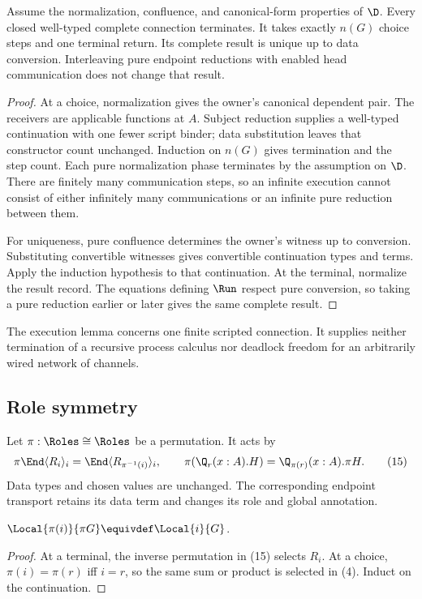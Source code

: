 \begin{lemma}
\label{thm:termination}
Assume the normalization, confluence, and canonical-form properties of $\D$.
Every closed well-typed complete connection terminates. It takes exactly
$n(G)$ choice steps and one terminal return. Its complete result is unique up
to data conversion. Interleaving pure endpoint reductions with enabled head
communication does not change that result.
\end{lemma}
\begin{proof}
At a choice, normalization gives the owner's canonical dependent pair. The
receivers are applicable functions at $A$. Subject reduction supplies a
well-typed continuation with one fewer script binder; data substitution leaves
that constructor count unchanged. Induction on $n(G)$ gives termination and
the step count. Each pure normalization phase terminates by the assumption on
$\D$. There are finitely many communication steps, so an infinite execution
cannot consist of either infinitely many communications or an infinite pure
reduction between them.

For uniqueness, pure confluence determines the owner's witness up to
conversion. Substituting convertible witnesses gives convertible continuation
types and terms. Apply the induction hypothesis to that continuation. At the
terminal, normalize the result record. The equations defining $\Run$ respect
pure conversion, so taking a pure reduction earlier or later gives the same
complete result.
\end{proof}

The execution lemma concerns one finite scripted connection. It supplies neither
termination of a recursive process calculus nor deadlock freedom for an
arbitrarily wired network of channels.

\subsection{Role symmetry}

Let $\pi:\Roles\cong\Roles$ be a permutation. It acts by
\[
 \pi\End\langle R_i\rangle_i
   =\End\langle R_{\pi^{-1}(i)}\rangle_i,
 \qquad
 \pi(\Q_r(x:A).H)=\Q_{\pi(r)}(x:A).\pi H.
 \tag{15}
\]
Data types and chosen values are unchanged. The corresponding endpoint
transport retains its data term and changes its role and global annotation.

\begin{lemma}
\label{lem:role-transport}
$\Local{\pi(i)}{\pi G}\equivdef\Local{i}{G}$.
\end{lemma}
\begin{proof}
At a terminal, the inverse permutation in (15) selects $R_i$. At a choice,
$\pi(i)=\pi(r)$ iff $i=r$, so the same sum or product is selected in (4).
Induct on the continuation.
\end{proof}

